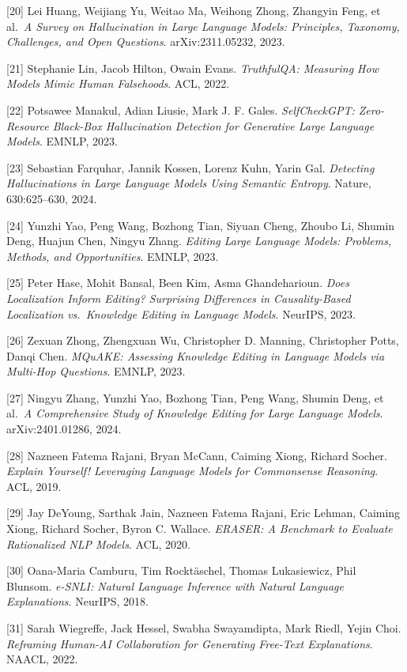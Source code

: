 {[}20{]} Lei Huang, Weijiang Yu, Weitao Ma, Weihong Zhong, Zhangyin Feng, et al.~\emph{A Survey on Hallucination in Large Language Models: Principles, Taxonomy, Challenges, and Open Questions}. arXiv:2311.05232, 2023.

{[}21{]} Stephanie Lin, Jacob Hilton, Owain Evans. \emph{TruthfulQA: Measuring How Models Mimic Human Falsehoods}. ACL, 2022.

{[}22{]} Potsawee Manakul, Adian Liusie, Mark J. F. Gales. \emph{SelfCheckGPT: Zero-Resource Black-Box Hallucination Detection for Generative Large Language Models}. EMNLP, 2023.

{[}23{]} Sebastian Farquhar, Jannik Kossen, Lorenz Kuhn, Yarin Gal. \emph{Detecting Hallucinations in Large Language Models Using Semantic Entropy}. Nature, 630:625--630, 2024.

{[}24{]} Yunzhi Yao, Peng Wang, Bozhong Tian, Siyuan Cheng, Zhoubo Li, Shumin Deng, Huajun Chen, Ningyu Zhang. \emph{Editing Large Language Models: Problems, Methods, and Opportunities}. EMNLP, 2023.

{[}25{]} Peter Hase, Mohit Bansal, Been Kim, Asma Ghandeharioun. \emph{Does Localization Inform Editing? Surprising Differences in Causality-Based Localization vs.~Knowledge Editing in Language Models}. NeurIPS, 2023.

{[}26{]} Zexuan Zhong, Zhengxuan Wu, Christopher D. Manning, Christopher Potts, Danqi Chen. \emph{MQuAKE: Assessing Knowledge Editing in Language Models via Multi-Hop Questions}. EMNLP, 2023.

{[}27{]} Ningyu Zhang, Yunzhi Yao, Bozhong Tian, Peng Wang, Shumin Deng, et al.~\emph{A Comprehensive Study of Knowledge Editing for Large Language Models}. arXiv:2401.01286, 2024.

{[}28{]} Nazneen Fatema Rajani, Bryan McCann, Caiming Xiong, Richard Socher. \emph{Explain Yourself! Leveraging Language Models for Commonsense Reasoning}. ACL, 2019.

{[}29{]} Jay DeYoung, Sarthak Jain, Nazneen Fatema Rajani, Eric Lehman, Caiming Xiong, Richard Socher, Byron C. Wallace. \emph{ERASER: A Benchmark to Evaluate Rationalized NLP Models}. ACL, 2020.

{[}30{]} Oana-Maria Camburu, Tim Rocktäschel, Thomas Lukasiewicz, Phil Blunsom. \emph{e-SNLI: Natural Language Inference with Natural Language Explanations}. NeurIPS, 2018.

{[}31{]} Sarah Wiegreffe, Jack Hessel, Swabha Swayamdipta, Mark Riedl, Yejin Choi. \emph{Reframing Human-AI Collaboration for Generating Free-Text Explanations}. NAACL, 2022.

